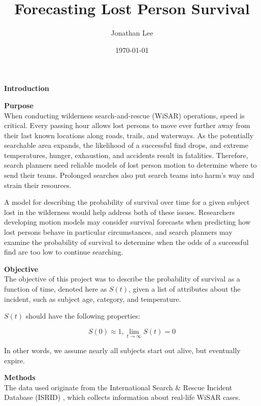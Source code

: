 \documentclass[serif,final]{beamer}
\title{Forecasting Lost Person Survival}
\author{Jonathan Lee}
\institute{TJHSST Computer Systems Lab}
\date{\today}
\newcommand{\heading}[1]{{\large \textbf{#1}}\\}
\newcommand{\subheading}[1]{{\textbf{#1}}\\}
\begin{document}
  \justify
  \begin{frame}
    \titlepage

    \begin{multicols}{3}
      \heading{Introduction}

      \indent

      \subheading{Purpose}

      When conducting wilderness search-and-rescue (WiSAR) operations, speed is critical. Every
      passing hour allows lost persons to move ever further away from their
      last known locations along roads, trails, and waterways. As the
      potentially searchable area expands, the likelihood of a successful find
      drops, and extreme temperatures, hunger, exhaustion, and accidents result
      in fatalities. Therefore, search planners need reliable models of lost
      person motion to determine where to send their teams. Prolonged searches also put search teams into harm's way and strain their
      resources.

      \indent

      A model for describing the probability of survival over time for a given
      subject lost in the wilderness would help address both of these issues.
      Researchers developing motion models may consider survival forecasts when
      predicting how lost persons behave in particular circumstances, and
      search planners may examine the probability of survival to determine when the odds of a successful find are too low to continue searching.

      \indent

      \subheading{Objective}

      The objective of this project was to describe the probability of survival
      as a function of time, denoted here as $S(t)$, given a list of attributes
      about the incident, such as subject age, category, and temperature.

      \indent

      $S(t)$ should have the following properties:

      $$S(0) \approx 1, \lim_{t \to \infty} S(t) = 0$$

      In other words, we assume nearly all subjects start out alive, but
      eventually expire.

      \indent

      \vfill
      \columnbreak

      \heading{Methods}

      The data used originate from the International Search \& Rescue Incident
      Database (ISRID) \cite{isrid}, which collects information about real-life
      WiSAR cases.


\end{multicols}
\end{frame}
\end{document}
